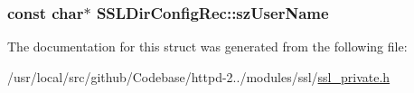 \subsubsection[{\texorpdfstring{sz\+User\+Name}{szUserName}}]{\setlength{\rightskip}{0pt plus 5cm}const char$\ast$ S\+S\+L\+Dir\+Config\+Rec\+::sz\+User\+Name}\hypertarget{structSSLDirConfigRec_af6b8cdb7590580d6977dd780c455842a}{}\label{structSSLDirConfigRec_af6b8cdb7590580d6977dd780c455842a}


The documentation for this struct was generated from the following file\+:\begin{DoxyCompactItemize}
\item 
/usr/local/src/github/\+Codebase/httpd-\/2../modules/ssl/\hyperlink{ssl__private_8h}{ssl\+\_\+private.\+h}\end{DoxyCompactItemize}
